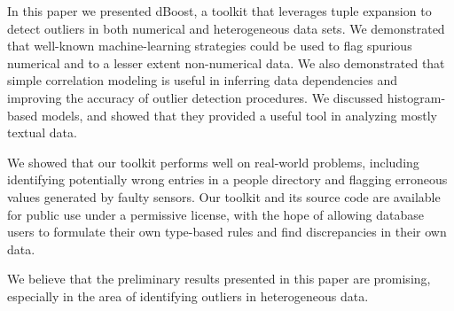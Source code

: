 
In this paper we presented dBoost, a toolkit that leverages tuple expansion to detect outliers in both numerical and heterogeneous data sets. We demonstrated that well-known machine-learning strategies could be used to flag spurious numerical and to a lesser extent non-numerical data. We also demonstrated that simple correlation modeling is useful in inferring data dependencies and improving the accuracy of outlier detection procedures. We discussed histogram-based models, and showed that they provided a useful tool in analyzing mostly textual data.

We showed that our toolkit performs well on real-world problems, including identifying potentially wrong entries in a people directory and flagging erroneous values generated by faulty sensors. Our toolkit and its source code are available for public use under a permissive license, with the hope of allowing database users to formulate their own type-based rules and find discrepancies in their own data.

We believe that the preliminary results presented in this paper are promising, especially in the area of identifying outliers in heterogeneous data.

